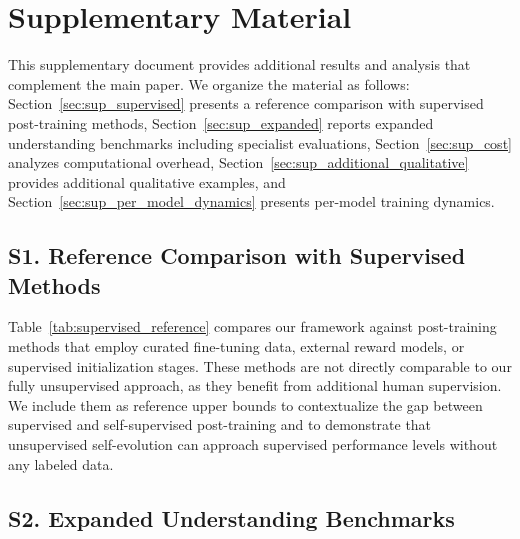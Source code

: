 
\section*{Supplementary Material}

This supplementary document provides additional results and analysis that complement the main paper. We organize the material as follows: Section~\ref{sec:sup_supervised} presents a reference comparison with supervised post-training methods, Section~\ref{sec:sup_expanded} reports expanded understanding benchmarks including specialist evaluations, Section~\ref{sec:sup_cost} analyzes computational overhead, Section~\ref{sec:sup_additional_qualitative} provides additional qualitative examples, and Section~\ref{sec:sup_per_model_dynamics} presents per-model training dynamics.


\subsection*{S1. Reference Comparison with Supervised Methods}
\label{sec:sup_supervised}

Table~\ref{tab:supervised_reference} compares our framework against post-training methods that employ curated fine-tuning data, external reward models, or supervised initialization stages. These methods are not directly comparable to our fully unsupervised approach, as they benefit from additional human supervision. We include them as reference upper bounds to contextualize the gap between supervised and self-supervised post-training and to demonstrate that unsupervised self-evolution can approach supervised performance levels without any labeled data.




\subsection*{S2. Expanded Understanding Benchmarks}
\label{sec:sup_expanded}

